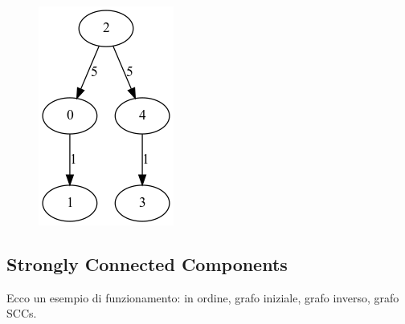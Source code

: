 \documentclass{article}
\begin{document}
\begin{figure}[!htb]
\endminipage\hfill
{}
  \includegraphics[width=\linewidth]{"./output/graph_prim_iteration_5.png"}

\endminipage
\end{figure}


\newpage
\subsection{Strongly Connected Components}
Ecco un esempio di funzionamento: in ordine, grafo iniziale, grafo inverso, grafo SCCs.
\end{document}
